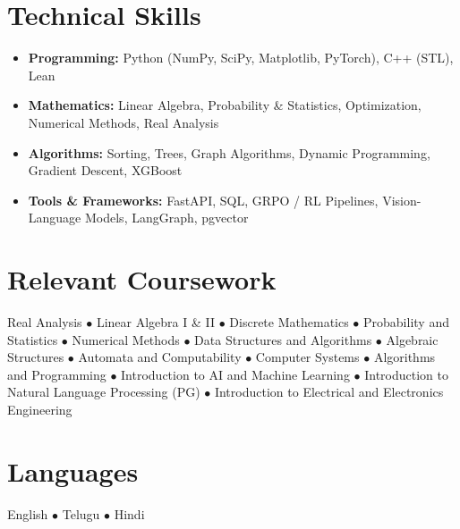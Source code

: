 \documentclass[10pt,a4paper]{article}
\begin{document}
\section*{Technical Skills}
\begin{itemize}
  \item \textbf{Programming:} Python (NumPy, SciPy, Matplotlib, PyTorch), C++ (STL), Lean
  \item \textbf{Mathematics:} Linear Algebra, Probability \& Statistics, Optimization, Numerical Methods, Real Analysis
  \item \textbf{Algorithms:} Sorting, Trees, Graph Algorithms, Dynamic Programming, Gradient Descent, XGBoost
  \item \textbf{Tools \& Frameworks:} FastAPI, SQL, GRPO / RL Pipelines, Vision-Language Models, LangGraph, pgvector
\end{itemize}

\section*{Relevant Coursework}
Real Analysis $\bullet$ Linear Algebra I \& II $\bullet$ Discrete Mathematics $\bullet$ Probability and Statistics $\bullet$ Numerical Methods $\bullet$ Data Structures and Algorithms $\bullet$ Algebraic Structures $\bullet$ Automata and Computability $\bullet$ Computer Systems $\bullet$ Algorithms and Programming $\bullet$ Introduction to AI and Machine Learning $\bullet$ Introduction to Natural Language Processing (PG) $\bullet$ Introduction to Electrical and Electronics Engineering

\section*{Languages}
English $\bullet$ Telugu $\bullet$ Hindi
\end{document}
